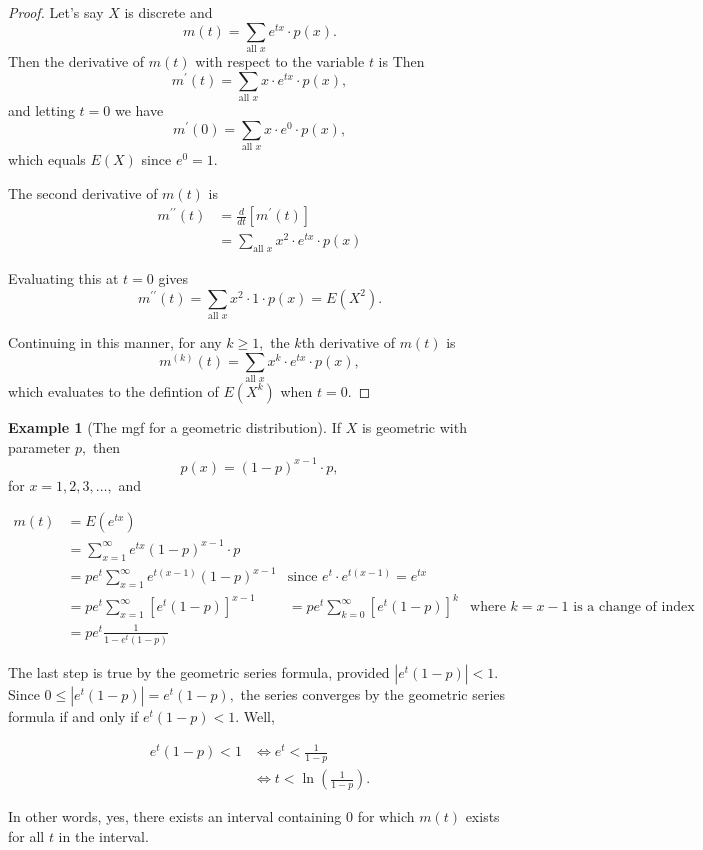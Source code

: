 \documentclass[
]{book}
\theoremstyle{definition}
\theoremstyle{definition}
\newtheorem{example}{Example}[chapter]
\theoremstyle{definition}
\theoremstyle{definition}
\theoremstyle{remark}
\begin{document}
\begin{proof}
Let's say \(X\) is discrete and \[m(t) = \sum_{\text{all }x} e^{tx}\cdot p(x).\]
Then the derivative of \(m(t)\) with respect to the variable \(t\) is
Then \[m^\prime(t) = \sum_{\text{all }x} x\cdot e^{tx}\cdot p(x),\]
and letting \(t = 0\) we have
\[m^\prime(0) = \sum_{\text{all }x} x\cdot e^{0}\cdot p(x),\] which equals \(E(X)\) since \(e^0 = 1\).

The second derivative of \(m(t)\) is
\begin{align*}
m^{\prime\prime}(t) &= \frac{d}{dt}\left[m^\prime(t)\right]\\
  &=\sum_{\text{all }x} x^2\cdot e^{tx}\cdot p(x)
\end{align*}

Evaluating this at \(t = 0\) gives \[m^{\prime\prime}(t)=\sum_{\text{all }x} x^2\cdot 1 \cdot p(x) = E(X^2).\]

Continuing in this manner, for any \(k \geq 1,\) the \(k\)th derivative of \(m(t)\) is \[m^{(k)}(t)=\sum_{\text{all }x} x^k\cdot e^{tx}\cdot p(x),\] which evaluates to the defintion of \(E(X^k)\) when \(t = 0\).
\end{proof}

\begin{example}[The mgf for a geometric distribution]
\protect\hypertarget{exm:mgf-geometric}{}\label{exm:mgf-geometric}If \(X\) is geometric with parameter \(p,\) then \[p(x) = (1-p)^{x-1}\cdot p,\] for \(x = 1, 2, 3, \ldots,\) and

\begin{align*}
m(t) &= E(e^{tx})\\
  &= \sum_{x = 1}^\infty e^{tx}(1-p)^{x-1}\cdot p\\
  &= pe^t \sum_{x=1}^\infty e^{t(x-1)}(1-p)^{x-1} &\text{since }e^t\cdot e^{t(x-1)} = e^{tx}\\
  &= pe^t \sum_{x=1}^\infty[e^t(1-p)]^{x-1}
  &= pe^t \sum_{k=0}^\infty[e^t(1-p)]^{k} &\text{where }k=x-1 \text{ is a change of index}\\
  &= pe^t\frac{1}{1-e^t(1-p)} 
\end{align*}

The last step is true by the geometric series formula, provided \(|e^t(1-p)|<1\).
Since \(0\leq |e^t(1-p)| = e^t(1-p),\) the series converges by the geometric series formula if and only if \(e^t(1-p) < 1\). Well,

\begin{align*}
e^t(1-p) < 1 &\iff e^t < \frac{1}{1-p} \\
 &\iff t < \ln\left(\frac{1}{1-p}\right).
\end{align*}

In other words, yes, there exists an interval containing 0 for which \(m(t)\) exists for all \(t\) in the interval.
\end{example}
\end{document}
